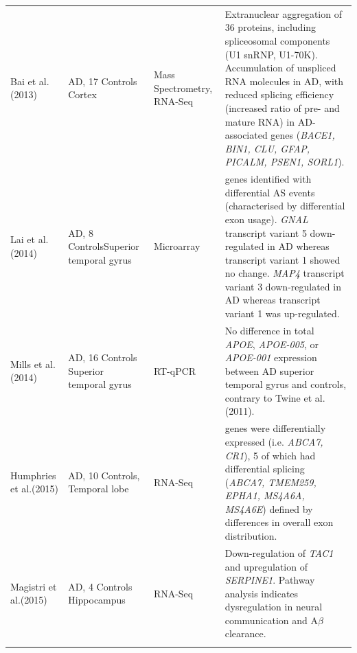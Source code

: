 \begin{landscape}
\begin{longtable}[c]{p{3cm}p{4cm}p{3cm}p{16cm}}
		\centering Bai et al. \newline(2013)\cite{Bai2013} &
		\centering 18 AD, 17 Controls \newline Cortex &
		\centering Mass Spectrometry, RNA-Seq &
		\tabitem Extranuclear aggregation of 36 proteins, including spliceosomal components (U1 snRNP, U1-70K). \newline
		\tabitem Accumulation of unspliced RNA molecules in AD, with reduced splicing efficiency (increased ratio of pre- and mature RNA) in AD-associated genes (\textit{BACE1, BIN1, CLU, GFAP, PICALM, PSEN1, SORL1}).  \\
		\hdashline[0.5pt/5pt]
		
		\centering  Lai et al. \newline(2014)\cite{Lai2014} &
		\centering 8 AD, 8 Controls\newline Superior temporal gyrus &
		\centering Microarray &
		\tabitem 22 genes identified with differential AS events (characterised by differential exon usage). \newline  
		\tabitem \textit{GNAL} transcript variant 5 down-regulated in AD whereas transcript variant 1 showed no change. \newline 
		\tabitem \textit{MAP4} transcript variant 3 down-regulated in AD whereas transcript variant 1 was up-regulated.\\
		\hdashline[0.5pt/5pt]
		
		\centering Mills et al. (2014)\cite{Mills2014} &
		\centering 14 AD, 16 Controls \newline Superior temporal gyrus &
		\centering RT-qPCR &
		\tabitem No difference in total \textit{APOE}, \textit{APOE-005}, or \textit{APOE-001} expression between AD superior temporal gyrus and controls, contrary to Twine et al. (2011)\cite{Twine2011}. \\
		
		\centering Humphries et al.(2015)\cite{Humphries2015} &
		\centering 10 AD, 10 Controls, \newline Temporal lobe &
		\centering RNA-Seq &
		\tabitem 9 genes were differentially expressed (i.e. \textit{ABCA7, CR1}), 5 of which had differential splicing (\textit{ABCA7, TMEM259, EPHA1, MS4A6A, MS4A6E}) defined by differences in overall exon distribution. \\
		\hdashline[0.5pt/5pt]
		
		\centering Magistri et al.(2015)\cite{Magistri2015} &
		\centering 4 AD, 4 Controls \newline Hippocampus &
		\centering RNA-Seq &
		\tabitem Down-regulation of \textit{TAC1} and upregulation of \textit{SERPINE1}. \newline 
		\tabitem Pathway analysis indicates dysregulation in neural communication and A$\beta$ clearance. \\		
		\hdashline[0.5pt/5pt]
		

\end{longtable}
\end{landscape}
